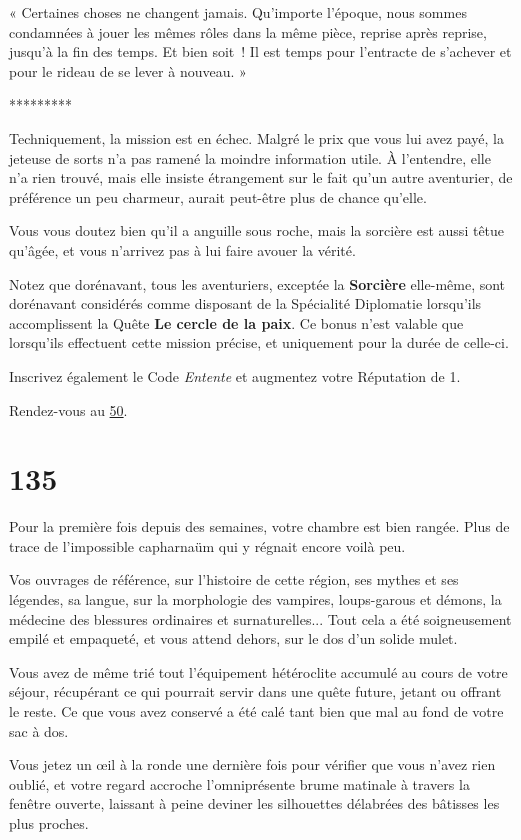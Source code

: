\documentclass{report}
\newcommand{\gsection}[1]{
    \section{#1}
    \label{section-#1}
}
\newcommand{\glink}[1]{\hyperref[section-#1]{#1}}
\newcommand{\ellipse}{
    \begin{center}
        *********
    \end{center}
}
\newcommand{\hero}[1]{\textbf{#1}}
\begin{document}
« Certaines choses ne changent jamais. Qu'importe l'époque, nous sommes condamnées à jouer les mêmes rôles dans la même pièce, reprise après reprise, jusqu'à la fin des temps. Et bien soit ! Il est temps pour l'entracte de s'achever et pour le rideau de se lever à nouveau. »

\ellipse

Techniquement, la mission est en échec. Malgré le prix que vous lui avez payé, la jeteuse de sorts n'a pas ramené la moindre information utile. À l'entendre, elle n'a rien trouvé, mais elle insiste étrangement sur le fait qu'un autre aventurier, de préférence un peu charmeur, aurait peut-être plus de chance qu'elle.

Vous vous doutez bien qu'il a anguille sous roche, mais la sorcière est aussi têtue qu'âgée, et vous n'arrivez pas à lui faire avouer la vérité.

Notez que dorénavant, tous les aventuriers, exceptée la \hero{Sorcière} elle-même, sont dorénavant considérés comme disposant de la Spécialité Diplomatie lorsqu'ils accomplissent la Quête \textbf{Le cercle de la paix}. Ce bonus n'est valable que lorsqu'ils effectuent cette mission précise, et uniquement pour la durée de celle-ci.

Inscrivez également le Code \emph{Entente} et augmentez votre Réputation de 1.

Rendez-vous au \glink{50}.

\gsection{135}

Pour la première fois depuis des semaines, votre chambre est bien rangée. Plus de trace de l'impossible capharnaüm qui y régnait encore voilà peu. 

Vos ouvrages de référence, sur l'histoire de cette région, ses mythes et ses légendes, sa langue, sur la morphologie des vampires, loups-garous et démons, la médecine des blessures ordinaires et surnaturelles... Tout cela a été soigneusement empilé et empaqueté, et vous attend dehors, sur le dos d'un solide mulet. 

Vous avez de même trié tout l'équipement hétéroclite accumulé au cours de votre séjour, récupérant ce qui pourrait servir dans une quête future, jetant ou offrant le reste. Ce que vous avez conservé a été calé tant bien que mal au fond de votre sac à dos. 

Vous jetez un œil à la ronde une dernière fois pour vérifier que vous n'avez rien oublié, et votre regard accroche l'omniprésente brume matinale à travers la fenêtre ouverte, laissant à peine deviner les silhouettes délabrées des bâtisses les plus proches. 
\end{document}
